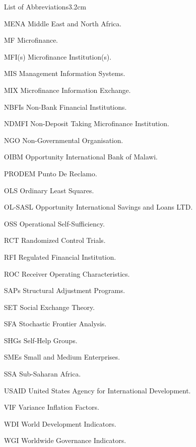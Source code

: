 \begin{mclistof}{List of Abbreviations}{3.2cm}
\item[MENA] Middle East and North Africa.

\item[MF] Microfinance.

\item[MFI(s)] Microfinance Institution(s).

\item[MIS] Management Information Systems.

\item[MIX] Microfinance Information Exchange.

\item[NBFIs] Non-Bank Financial Institutions.

\item[NDMFI] Non-Deposit Taking Microfinance Institution.

\item[NGO] Non-Governmental Organisation.

\item[OIBM] Opportunity International Bank of Malawi.

\item[PRODEM] Punto De Reclamo.

\item[OLS] Ordinary Least Squares.

\item[OL-SASL] Opportunity International Savings and Loans LTD.

\item[OSS] Operational Self-Sufficiency.

\item[RCT] Randomized Control Trials.

\item[RFI] Regulated Financial Institution.

\item[ROC] Receiver Operating Characteristics.

\item[SAPs] Structural Adjustment Programs.

\item[SET] Social Exchange Theory.

\item[SFA] Stochastic Frontier Analysis.

\item[SHGs] Self-Help Groups.

\item[SMEs] Small and Medium Enterprises.

\item[SSA] Sub-Saharan Africa.

\item[USAID] United States Agency for International Development.

\item[VIF] Variance Inflation Factors.

\item[WDI] World Development Indicators.

\item[WGI] Worldwide Governance Indicators.

\end{mclistof} 
